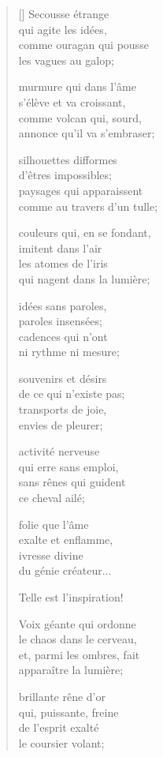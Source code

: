 \documentclass[a4paper,12pt]{book}
\begin{document}
\begin{verse}[\versewidth]
  Secousse étrange \\
  qui agite les idées, \\
  comme ouragan qui pousse \\
  les vagues au galop;

  murmure qui dans l'âme \\
  s'élève et va croissant, \\
  comme volcan qui, sourd, \\
  annonce qu'il va s'embraser;

  silhouettes difformes \\
  d'êtres impossibles; \\
  paysages qui apparaissent \\
  comme au travers d'un tulle;

  couleurs qui, en se fondant, \\
  imitent dans l'air \\
  les atomes de l'iris \\
  qui nagent dans la lumière;

  idées sans paroles, \\
  paroles insensées; \\
  cadences qui n'ont \\
  ni rythme ni mesure;

  souvenirs et désirs \\
  de ce qui n'existe pas; \\
  transports de joie, \\
  envies de pleurer;

  activité nerveuse \\
  qui erre sans emploi, \\
  sans rênes qui guident \\
  ce cheval ailé;

  folie que l'âme \\
  exalte et enflamme, \\
  ivresse divine \\
  du génie créateur...

  Telle est l'inspiration!

  Voix géante qui ordonne \\
  le chaos dans le cerveau, \\
  et, parmi les ombres, fait \\
  apparaître la lumière;

  brillante rêne d'or \\
  qui, puissante, freine \\
  de l'esprit exalté \\
  le coursier volant;


\end{verse}
\end{document}
